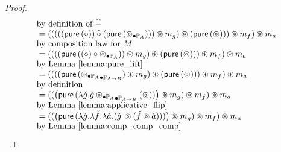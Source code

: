 \begin{proof}
$$\begin{array}{ll}
 \mbox{by definition of }\mathbin{\widehat{-}} \\
{}= (  ( (  ((\mathsf{pure}\, (\circ)) \mathbin{\widehat{\circ}}  (\mathsf{pure}\, (\mathbin{\circledcirc_{\bullet \mathbb{P}_{A}}}) )) \circledast m_g  ) \circledast (\mathsf{pure}\, (\circledcirc)) ) \circledast m_f  ) \circledast m_a\\
 \mbox{by composition law for }M \\
{}= (  ( (  (\mathsf{pure}\, ((\circ) \circ \mathbin{\circledcirc_{\bullet \mathbb{P}_{A}}})) \circledast m_g  ) \circledast (\mathsf{pure}\, (\circledcirc)) ) \circledast m_f  ) \circledast m_a\\
 \mbox{by Lemma \ref{lemma:pure_lift}}\\
{}= (  ( (  (\mathsf{pure}\, (\mathbin{\mathbin{\circledcirc_{\bullet \mathbb{P}_{A}}}_{\bullet \mathbb{P}_{A\rightarrow B}}}) \circledast m_g  ) \circledast (\mathsf{pure}\, (\circledcirc)) ) \circledast m_f  ) \circledast m_a\\
 \mbox{by definition}\\
{}= (  (  \big(\mathsf{pure}\, (\lambda \check{g} . \check{g} \mathbin{\mathbin{\circledcirc_{\bullet \mathbb{P}_{A}}}_{\bullet \mathbb{P}_{A\rightarrow B}}} (\circledcirc) ) \big) \circledast m_g   ) \circledast m_f  ) \circledast m_a\\
 \mbox{by Lemma \ref{lemma:applicative_flip}}\\
{}= (  (  \big(\mathsf{pure}\, (\lambda \check{g} . \lambda \check{f}. \lambda \check{a} . (\check{g}\, \circledcirc (\check{f} \circledcirc \check{a})) ) \big) \circledast m_g   ) \circledast m_f  ) \circledast m_a\\
 \mbox{by Lemma \ref{lemma:comp_comp_comp}}\\
\end{array}
$$


\end{proof}



















